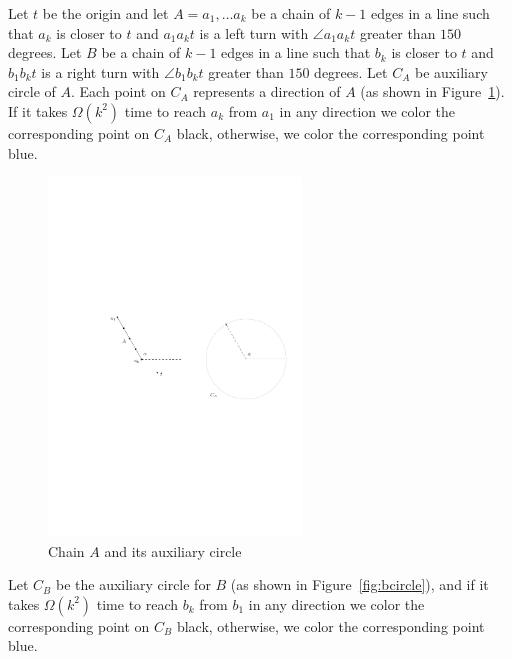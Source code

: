\documentclass [letterpaper] {patmorin}
\begin{document}
Let $t$ be the origin and 
let $A=a_1,\ldots a_k$ be a chain of $k-1$ edges in a line such that $a_{k}$ is closer to $t$ and $a_{1}a_{k}t$ is a left turn with $\angle a_{1}a_{k}t$ greater than $150$ degrees. Let $B$ be a chain of $k-1$ edges in a line such that $b_{k}$ is closer to $t$ and $b_{1}b_{k}t$ is a right turn with $\angle b_{1}b_{k}t$ greater than $150$ degrees. Let $C_{A}$ be auxiliary circle of $A$. Each point on $C_{A}$ represents a direction of $A$ (as shown in Figure~\ref{fig:acircle}). If it takes $\Omega (k^{2})$ time to reach $a_{k}$ from $a_{1}$ in any direction we color the corresponding point on $C_{A}$ black, otherwise, we color the corresponding point blue.
\begin{figure}[ht]
  \centering
  \includegraphics[width=0.6\textwidth]{pics/achaincircle.pdf}
  \caption{Chain $A$ and its auxiliary circle}
  \label{fig:acircle}
\end{figure}
Let $C_{B}$ be the auxiliary circle for $B$ (as shown in Figure~\ref{fig:bcircle}), and if it takes $\Omega (k^{2})$ time to reach $b_{k}$ from $b_{1}$ in any direction we color the corresponding point on $C_{B}$ black, otherwise, we color the corresponding point blue.
\end{document}
